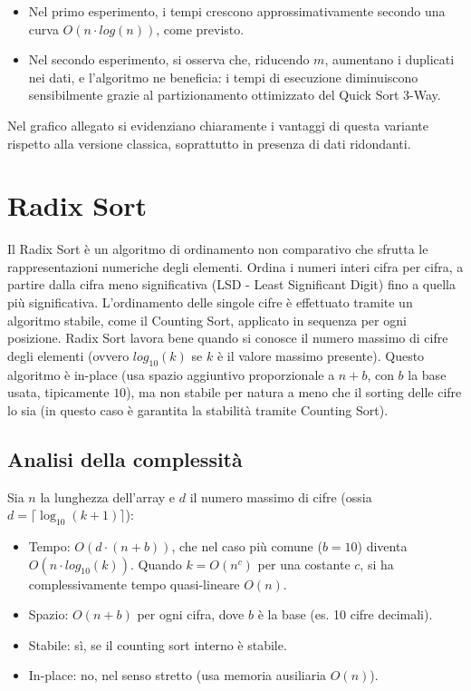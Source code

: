 \documentclass[a4paper, 12pt, oneside]{book}
\begin{document}
\begin{itemize}
    \item Nel primo esperimento, i tempi crescono approssimativamente secondo una curva \(O(n \cdot log(n))\), come previsto.
    \item Nel secondo esperimento, si osserva che, riducendo \(m\), aumentano i duplicati nei dati, e l'algoritmo ne beneficia: i tempi di esecuzione diminuiscono sensibilmente grazie al partizionamento ottimizzato del Quick Sort 3-Way.
\end{itemize}

\noindent Nel grafico allegato si evidenziano chiaramente i vantaggi di questa variante rispetto alla versione classica, soprattutto in presenza di dati ridondanti.


\chapter{Radix Sort}\label{chap:Radix Sort} %

Il Radix Sort è un algoritmo di ordinamento non comparativo che sfrutta le rappresentazioni numeriche degli elementi. Ordina i numeri interi cifra per cifra, a partire dalla cifra meno significativa (LSD - Least Significant Digit) fino a quella più significativa. L'ordinamento delle singole cifre è effettuato tramite un algoritmo stabile, come il Counting Sort, applicato in sequenza per ogni posizione.
Radix Sort lavora bene quando si conosce il numero massimo di cifre degli elementi (ovvero \(log_{10}(k)\) se \(k\) è il valore massimo presente).
Questo algoritmo è in-place (usa spazio aggiuntivo proporzionale a \(n + b\), con \(b\) la base usata, tipicamente \(10\)), ma non stabile per natura a meno che il sorting delle cifre lo sia (in questo caso è garantita la stabilità tramite Counting Sort).

\section{Analisi della complessità}
Sia \(n\) la lunghezza dell'array e \(d\) il numero massimo di cifre (ossia \( d = \lceil \log_{10}(k + 1) \rceil \)): \\

\begin{itemize}
    \item Tempo: \(O(d \cdot (n + b))\), che nel caso più comune (\(b = 10\)) diventa \(O(n \cdot log_{10}(k))\). Quando \(k = O(n^c)\) per una costante \(c\), si ha complessivamente tempo quasi-lineare \(O(n)\).
    \item Spazio: \(O(n + b)\) per ogni cifra, dove \(b\) è la base (es. 10 cifre decimali).
    \item Stabile: sì, se il counting sort interno è stabile.
    \item In-place: no, nel senso stretto (usa memoria ausiliaria \(O(n)\)).
\end{itemize}
\end{document}

